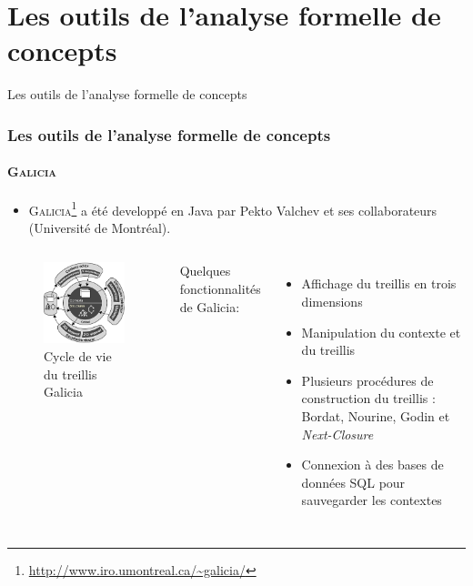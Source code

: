 \documentclass[french]{beamer}
\begin{document}
\section[Outils]{Les outils de l'analyse formelle de concepts}
\begin{frame}
\huge{\centerline{Les outils de l'analyse formelle de concepts}}
\end{frame}
\begin{frame}
\frametitle{Les outils de l'analyse formelle de concepts}
\framesubtitle{\textsc{Galicia}}
\begin{itemize}
\item \textsc{Galicia}\footnote{\url{http://www.iro.umontreal.ca/~galicia/}} a été developpé en Java par Pekto Valchev et ses collaborateurs (Université de Montréal).
\end{itemize}
\begin{columns}[c] %

\begin{figure}[H]
\begin{center}\includegraphics[scale=0.40]{figures/galicia-life-cycle.png}\end{center}
\caption{Cycle de vie du treillis Galicia}
\label{cap:fig:galicia-life-cycle}
\end{figure}

Quelques fonctionnalités de Galicia:
\begin{itemize}
\item Affichage du treillis en trois dimensions
\item Manipulation du contexte et du treillis
\item Plusieurs procédures de construction du treillis : Bordat, Nourine, Godin et \emph{Next-Closure}
\item Connexion à des bases de données SQL pour sauvegarder les contextes
\end{itemize}
\end{columns}

\end{frame}
\end{document}
